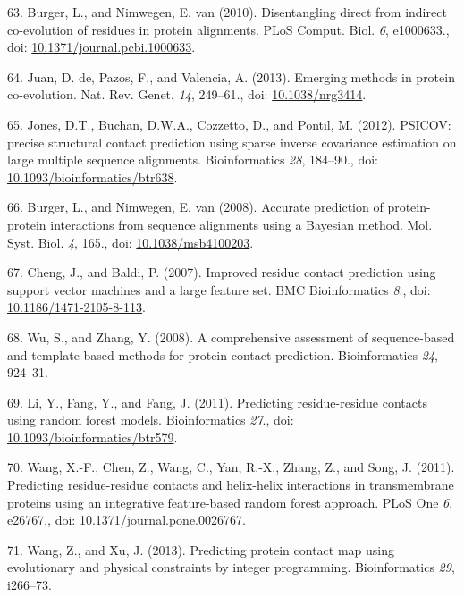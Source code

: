\documentclass[11pt,a4paper,twoside]{book}
\theoremstyle{definition}
\theoremstyle{definition}
\theoremstyle{remark}
\begin{document}
\hypertarget{ref-Burger2010}{}
63. Burger, L., and Nimwegen, E. van (2010). Disentangling direct from
indirect co-evolution of residues in protein alignments. PLoS Comput.
Biol. \emph{6}, e1000633., doi:
\href{https://doi.org/10.1371/journal.pcbi.1000633}{10.1371/journal.pcbi.1000633}.

\hypertarget{ref-DeJuan2013}{}
64. Juan, D. de, Pazos, F., and Valencia, A. (2013). Emerging methods in
protein co-evolution. Nat. Rev. Genet. \emph{14}, 249--61., doi:
\href{https://doi.org/10.1038/nrg3414}{10.1038/nrg3414}.

\hypertarget{ref-Jones2012}{}
65. Jones, D.T., Buchan, D.W.A., Cozzetto, D., and Pontil, M. (2012).
PSICOV: precise structural contact prediction using sparse inverse
covariance estimation on large multiple sequence alignments.
Bioinformatics \emph{28}, 184--90., doi:
\href{https://doi.org/10.1093/bioinformatics/btr638}{10.1093/bioinformatics/btr638}.

\hypertarget{ref-Burger2008}{}
66. Burger, L., and Nimwegen, E. van (2008). Accurate prediction of
protein-protein interactions from sequence alignments using a Bayesian
method. Mol. Syst. Biol. \emph{4}, 165., doi:
\href{https://doi.org/10.1038/msb4100203}{10.1038/msb4100203}.

\hypertarget{ref-Cheng2007}{}
67. Cheng, J., and Baldi, P. (2007). Improved residue contact prediction
using support vector machines and a large feature set. BMC
Bioinformatics \emph{8}., doi:
\href{https://doi.org/10.1186/1471-2105-8-113}{10.1186/1471-2105-8-113}.

\hypertarget{ref-Wu2008}{}
68. Wu, S., and Zhang, Y. (2008). A comprehensive assessment of
sequence-based and template-based methods for protein contact
prediction. Bioinformatics \emph{24}, 924--31.

\hypertarget{ref-Li2011}{}
69. Li, Y., Fang, Y., and Fang, J. (2011). Predicting residue-residue
contacts using random forest models. Bioinformatics \emph{27}., doi:
\href{https://doi.org/10.1093/bioinformatics/btr579}{10.1093/bioinformatics/btr579}.

\hypertarget{ref-Wang2011}{}
70. Wang, X.-F., Chen, Z., Wang, C., Yan, R.-X., Zhang, Z., and Song, J.
(2011). Predicting residue-residue contacts and helix-helix interactions
in transmembrane proteins using an integrative feature-based random
forest approach. PLoS One \emph{6}, e26767., doi:
\href{https://doi.org/10.1371/journal.pone.0026767}{10.1371/journal.pone.0026767}.

\hypertarget{ref-Wang2013}{}
71. Wang, Z., and Xu, J. (2013). Predicting protein contact map using
evolutionary and physical constraints by integer programming.
Bioinformatics \emph{29}, i266--73.
\end{document}
